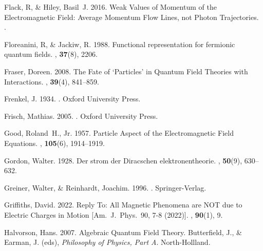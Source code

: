 \documentclass[12pt,onecolumn,secnumarabic,amsmath,amssymb,balancelastpage,nofootinbib]{article}
\begin{document}
\begin{thebibliography}{}
Flack, R, \& Hiley, Basil~J. 2016.
\newblock Weak Values of Momentum of the Electromagnetic Field: Average
  Momentum Flow Lines, not Photon Trajectories.
.

Floreanini, R, \& Jackiw, R. 1988.
\newblock Functional representation for fermionic quantum fields.
, {\bf 37}(8), 2206.

Fraser, Doreen. 2008.
\newblock The Fate of `Particles' in Quantum Field Theories with Interactions.
, {\bf
  39}(4), 841--859.

Frenkel, J. 1934.
.
\newblock Oxford University Press.

Frisch, Mathias. 2005.
.
\newblock Oxford University Press.

Good, Roland~H., Jr. 1957.
\newblock Particle Aspect of the Electromagnetic Field Equations.
, {\bf 105}(6), 1914--1919.

Gordon, Walter. 1928.
\newblock Der strom der Diracschen elektronentheorie.
, {\bf 50}(9), 630--632.

Greiner, Walter, \& Reinhardt, Joachim. 1996.
.
\newblock Springer-Verlag.

Griffiths, David. 2022.
\newblock Reply To: All Magnetic Phenomena are NOT due to Electric Charges in
  Motion [Am.\ J.\ Phys.\ 90, 7-8 (2022)].
, {\bf 90}(1), 9.

Halvorson, Hans. 2007.
\newblock Algebraic Quantum Field Theory.
 Butterfield, J., \& Earman, J. (eds), {\em
  Philosophy of Physics, Part A}.
\newblock North-Hollland.


\end{thebibliography}
\end{document}
